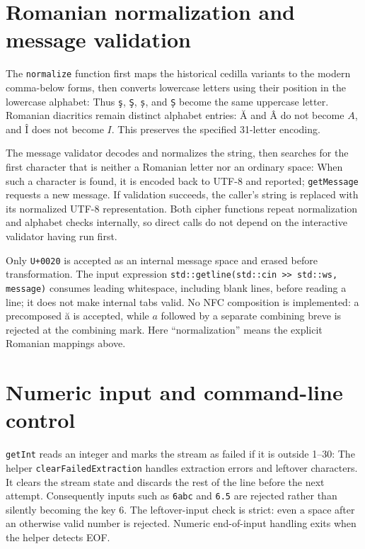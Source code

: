 \documentclass{utmreport}
\newcommand{\sourceexcerpt}[2]{\VerbatimInput[firstline=#1,lastline=#2]{../src/main.cpp}}
\begin{document}
\section{Romanian normalization and message validation}
The \texttt{normalize} function first maps the historical cedilla variants to the modern comma-below forms, then converts lowercase letters using their position in the lowercase alphabet:
\sourceexcerpt{216}{231}
Thus \texttt{ş}, \texttt{Ş}, \texttt{ș}, and \texttt{Ș} become the same uppercase letter. Romanian diacritics remain distinct alphabet entries: Ă and Â do not become $A$, and Î does not become $I$. This preserves the specified 31-letter encoding.

The message validator decodes and normalizes the string, then searches for the first character that is neither a Romanian letter nor an ordinary space:
\sourceexcerpt{240}{243}
When such a character is found, it is encoded back to UTF-8 and reported; \texttt{getMessage} requests a new message. If validation succeeds, the caller's string is replaced with its normalized UTF-8 representation. Both cipher functions repeat normalization and alphabet checks internally, so direct calls do not depend on the interactive validator having run first.

Only \texttt{U+0020} is accepted as an internal message space and erased before transformation. The input expression \texttt{std::getline(std::cin >> std::ws, message)} consumes leading whitespace, including blank lines, before reading a line; it does not make internal tabs valid. No NFC composition is implemented: a precomposed ă is accepted, while $a$ followed by a separate combining breve is rejected at the combining mark. Here ``normalization'' means the explicit Romanian mappings above.

\section{Numeric input and command-line control}
\texttt{getInt} reads an integer and marks the stream as failed if it is outside 1--30:
\sourceexcerpt{194}{198}
The helper \texttt{clearFailedExtraction} handles extraction errors and leftover characters. It clears the stream state and discards the rest of the line before the next attempt. Consequently inputs such as \texttt{6abc} and \texttt{6.5} are rejected rather than silently becoming the key 6. The leftover-input check is strict: even a space after an otherwise valid number is rejected. Numeric end-of-input handling exits when the helper detects EOF.
\end{document}
